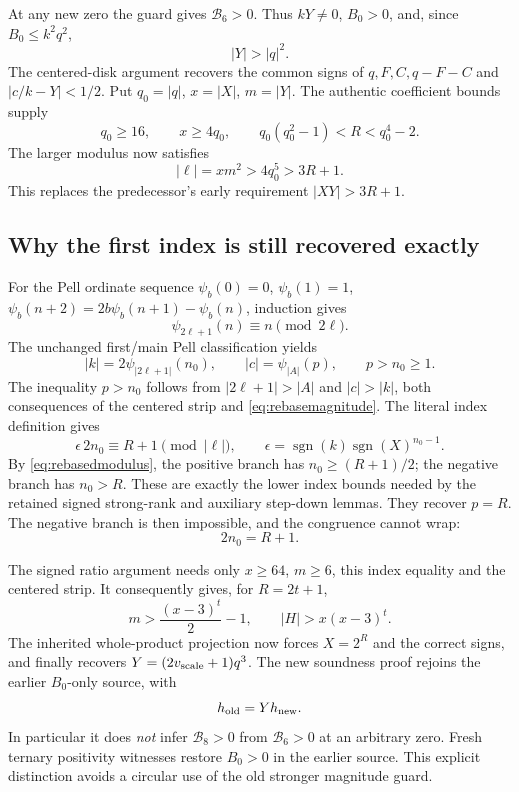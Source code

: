 At any new zero the guard gives $\mathcal B_6>0$. Thus $kY\ne0$,
$B_0>0$, and, since $B_0\le k^2q^2$,
\begin{equation}\label{eq:rebasemagnitude}
 |Y|>|q|^2.
\end{equation}
The centered-disk argument recovers the common signs of $q,F,C,q-F-C$
and $|c/k-Y|<1/2$. Put $q_0=|q|$, $x=|X|$, $m=|Y|$.
The authentic coefficient bounds supply
\[
 q_0\ge16,\qquad x\ge4q_0,\qquad
 q_0(q_0^2-1)<R<q_0^4-2.
\]
The larger modulus now satisfies
\begin{equation}\label{eq:rebasedmodulus}
 |\ell|=xm^2>4q_0^5>3R+1.
\end{equation}
This replaces the predecessor's early requirement $|XY|>3R+1$.

\subsection{Why the first index is still recovered exactly}
For the Pell ordinate sequence
$\psi_b(0)=0$, $\psi_b(1)=1$,
$\psi_b(n+2)=2b\psi_b(n+1)-\psi_b(n)$, induction gives
\[
 \psi_{2\ell+1}(n)\equiv n\pmod{2\ell}.
\]
The unchanged first/main Pell classification yields
\[
 |k|=2\psi_{|2\ell+1|}(n_0),\qquad
 |c|=\psi_{|A|}(p),\qquad p>n_0\ge1.
\]
The inequality $p>n_0$ follows from $|2\ell+1|>|A|$ and
$|c|>|k|$, both consequences of the centered strip and
\eqref{eq:rebasemagnitude}. The literal index definition gives
\[
 \epsilon\,2n_0\equiv R+1\pmod{|\ell|},\qquad
 \epsilon=\operatorname{sgn}(k)\operatorname{sgn}(X)^{n_0-1}.
\]
By \eqref{eq:rebasedmodulus}, the positive branch has
$n_0\ge(R+1)/2$; the negative branch has $n_0>R$.
These are exactly the lower index bounds needed by the retained signed
strong-rank and auxiliary step-down lemmas. They recover $p=R$.
The negative branch is then impossible, and the congruence cannot wrap:
\[
 2n_0=R+1.
\]

The signed ratio argument needs only $x\ge64$, $m\ge6$, this index
equality and the centered strip. It consequently gives, for $R=2t+1$,
\[
 m>\frac{(x-3)^t}{2}-1,\qquad |H|>x(x-3)^t.
\]
The inherited whole-product projection now forces
$X=2^R$ and the correct signs, and finally recovers
$Y=(2v_{\rm scale}+1)q^3$. The new soundness proof rejoins the earlier
$B_0$-only source, with
\[
 h_{\rm old}=Yh_{\rm new}.
\]
In particular it does \emph{not} infer $\mathcal B_8>0$ from
$\mathcal B_6>0$ at an arbitrary zero. Fresh ternary positivity witnesses
restore $B_0>0$ in the earlier source. This explicit distinction avoids a
circular use of the old stronger magnitude guard.

